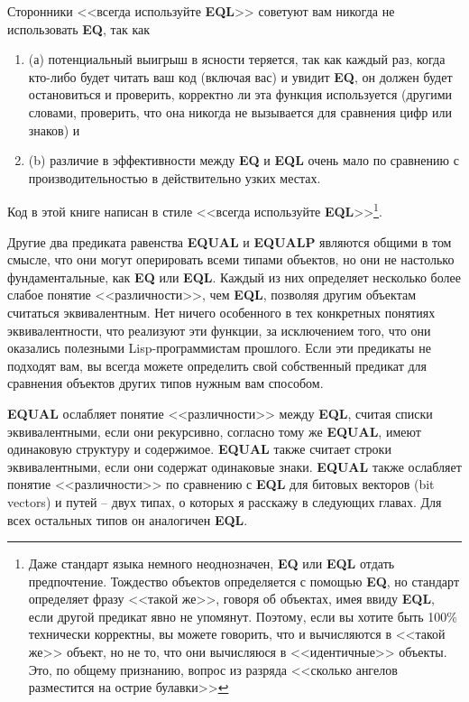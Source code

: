 Сторонники <<всегда используйте \textbf{EQL}>> советуют вам никогда не использовать
\textbf{EQ}, так как

\begin{enumerate}
\item (а) потенциальный выигрыш в ясности теряется, так как каждый раз, когда кто-либо
  будет читать ваш код (включая вас) и увидит \textbf{EQ}, он должен будет остановиться и
  проверить, корректно ли эта функция используется (другими словами, проверить, что она
  никогда не вызывается для сравнения цифр или знаков) и
\item (b) различие в эффективности между \textbf{EQ} и \textbf{EQL} очень мало по
  сравнению с производительностью в действительно узких местах.
\end{enumerate}

Код в этой книге написан в стиле <<всегда используйте \textbf{EQL}>>\footnote{Даже стандарт
  языка немного неоднозначен, \textbf{EQ} или \textbf{EQL} отдать предпочтение. Тождество
  объектов определяется с помощью \textbf{EQ}, но стандарт определяет фразу <<такой же>>,
  говоря об объектах, имея ввиду \textbf{EQL}, если другой предикат явно не
  упомянут. Поэтому, если вы хотите быть 100\% технически корректны, вы можете говорить,
  что  и  вычисляются в <<такой же>> объект, но не то, что они
  вычисляюся в <<идентичные>> объекты. Это, по общему признанию, вопрос из разряда <<сколько
  ангелов разместится на острие булавки>>}.

Другие два предиката равенства \textbf{EQUAL} и \textbf{EQUALP} являются общими в том
смысле, что они могут оперировать всеми типами объектов, но они не настолько
фундаментальные, как \textbf{EQ} или \textbf{EQL}. Каждый из них определяет несколько
более слабое понятие <<различности>>, чем \textbf{EQL}, позволяя другим объектам считаться
эквивалентным. Нет ничего особенного в тех конкретных понятиях эквивалентности, что
реализуют эти функции, за исключением того, что они оказались полезными Lisp-программистам
прошлого. Если эти предикаты не подходят вам, вы всегда можете определить свой собственный
предикат для сравнения объектов других типов нужным вам способом.

\textbf{EQUAL} ослабляет понятие <<различности>> между \textbf{EQL}, считая списки
эквивалентными, если они рекурсивно, согласно тому же \textbf{EQUAL}, имеют одинаковую
структуру и содержимое. \textbf{EQUAL} также считает строки эквивалентными, если они
содержат одинаковые знаки. \textbf{EQUAL} также ослабляет понятие <<различности>> по
сравнению с \textbf{EQL} для битовых векторов (bit vectors) и путей -- двух типах, о
которых я расскажу в следующих главах. Для всех остальных типов он аналогичен
\textbf{EQL}.

